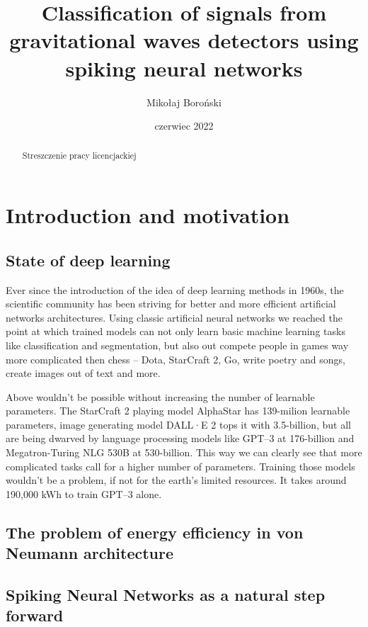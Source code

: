\documentclass{pracalicmgr2021}
\author{Mikołaj Boroński}
\title{Classification of signals from gravitational waves detectors using spiking neural networks}
\date{czerwiec 2022}
\begin{document}
    \maketitle
    \let\cleardoublepage\clearpage
    
    \begin{abstract}
    Streszczenie pracy licencjackiej
    \end{abstract}

    \tableofcontents

    \chapter{Introduction and motivation}
    \section{State of deep learning}
    Ever since the introduction of the idea of deep learning methods in 1960s, the scientific community has been striving for better and more efficient artificial networks architectures. Using classic artificial neural networks we reached the point at which trained models can not only learn basic machine learning tasks like classification and segmentation, but also out compete people in games way more complicated then chess -- Dota, StarCraft 2, Go, write poetry and songs, create images out of text and more. 
    
    Above wouldn't be possible without increasing the number of learnable parameters. The StarCraft 2 playing model AlphaStar has 139-milion learnable parameters, image generating model DALL·E 2 tops it with 3.5-billion, but all are being dwarved by language processing models like GPT--3 at 176-billion and Megatron-Turing NLG 530B at 530-billion\cite{alphastar, dalle, gpt, megatron}. This way we can clearly see that more complicated tasks call for a higher number of parameters. Training those models wouldn't be a problem, if not for the earth's limited resources. It takes around 190,000 kWh to train GPT--3 alone\cite{energy}. 
    
    \section{The problem of energy efficiency in von Neumann architecture}
    
    \section{Spiking Neural Networks as a natural step forward}
    
\end{document}
